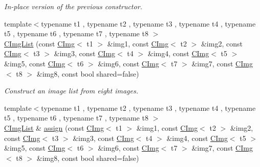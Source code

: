 \begin{DoxyCompactItemize}
\begin{DoxyCompactList}\small\item\em In-\/place version of the previous constructor. \item\end{DoxyCompactList}\item 
\hypertarget{structcimg__library_1_1_c_img_list_ae0b00db0ea5d0628239efe53a6939107}{
{\footnotesize template$<$typename t1 , typename t2 , typename t3 , typename t4 , typename t5 , typename t6 , typename t7 , typename t8 $>$ }\\\hyperlink{structcimg__library_1_1_c_img_list_ae0b00db0ea5d0628239efe53a6939107}{CImgList} (const \hyperlink{structcimg__library_1_1_c_img}{CImg}$<$ t1 $>$ \&img1, const \hyperlink{structcimg__library_1_1_c_img}{CImg}$<$ t2 $>$ \&img2, const \hyperlink{structcimg__library_1_1_c_img}{CImg}$<$ t3 $>$ \&img3, const \hyperlink{structcimg__library_1_1_c_img}{CImg}$<$ t4 $>$ \&img4, const \hyperlink{structcimg__library_1_1_c_img}{CImg}$<$ t5 $>$ \&img5, const \hyperlink{structcimg__library_1_1_c_img}{CImg}$<$ t6 $>$ \&img6, const \hyperlink{structcimg__library_1_1_c_img}{CImg}$<$ t7 $>$ \&img7, const \hyperlink{structcimg__library_1_1_c_img}{CImg}$<$ t8 $>$ \&img8, const bool shared=false)}
\label{structcimg__library_1_1_c_img_list_ae0b00db0ea5d0628239efe53a6939107}

\begin{DoxyCompactList}\small\item\em Construct an image list from eight images. \item\end{DoxyCompactList}\item 
\hypertarget{structcimg__library_1_1_c_img_list_a225eb41320c8ea851388dd71e05ebc9b}{
{\footnotesize template$<$typename t1 , typename t2 , typename t3 , typename t4 , typename t5 , typename t6 , typename t7 , typename t8 $>$ }\\\hyperlink{structcimg__library_1_1_c_img_list}{CImgList} \& \hyperlink{structcimg__library_1_1_c_img_list_a225eb41320c8ea851388dd71e05ebc9b}{assign} (const \hyperlink{structcimg__library_1_1_c_img}{CImg}$<$ t1 $>$ \&img1, const \hyperlink{structcimg__library_1_1_c_img}{CImg}$<$ t2 $>$ \&img2, const \hyperlink{structcimg__library_1_1_c_img}{CImg}$<$ t3 $>$ \&img3, const \hyperlink{structcimg__library_1_1_c_img}{CImg}$<$ t4 $>$ \&img4, const \hyperlink{structcimg__library_1_1_c_img}{CImg}$<$ t5 $>$ \&img5, const \hyperlink{structcimg__library_1_1_c_img}{CImg}$<$ t6 $>$ \&img6, const \hyperlink{structcimg__library_1_1_c_img}{CImg}$<$ t7 $>$ \&img7, const \hyperlink{structcimg__library_1_1_c_img}{CImg}$<$ t8 $>$ \&img8, const bool shared=false)}
\label{structcimg__library_1_1_c_img_list_a225eb41320c8ea851388dd71e05ebc9b}


\end{DoxyCompactItemize}
